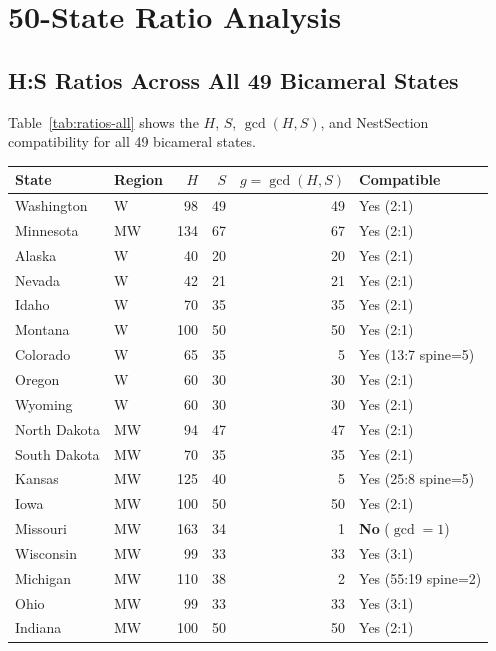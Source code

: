 \section{50-State Ratio Analysis}
\label{sec:analysis}

\subsection{H:S Ratios Across All 49 Bicameral States}
\label{sec:analysis:ratios}

Table~\ref{tab:ratios-all} shows the $H$, $S$, $\gcd(H,S)$, and
NestSection compatibility for all 49 bicameral states.

\begin{table}[h]
\centering\small
\begin{tabular}{llrrrl}
\toprule
State & Region & $H$ & $S$ & $g=\gcd(H,S)$ & Compatible \\
\midrule
Washington    & W    & 98  & 49  & 49  & Yes (2:1) \\
Minnesota     & MW   & 134 & 67  & 67  & Yes (2:1) \\
Alaska        & W    & 40  & 20  & 20  & Yes (2:1) \\
Nevada        & W    & 42  & 21  & 21  & Yes (2:1) \\
Idaho         & W    & 70  & 35  & 35  & Yes (2:1) \\
Montana       & W    & 100 & 50  & 50  & Yes (2:1) \\
Colorado      & W    & 65  & 35  & 5   & Yes (13:7 spine=5) \\
Oregon        & W    & 60  & 30  & 30  & Yes (2:1) \\
Wyoming       & W    & 60  & 30  & 30  & Yes (2:1) \\
North Dakota  & MW   & 94  & 47  & 47  & Yes (2:1) \\
South Dakota  & MW   & 70  & 35  & 35  & Yes (2:1) \\
Kansas        & MW   & 125 & 40  & 5   & Yes (25:8 spine=5) \\
Iowa          & MW   & 100 & 50  & 50  & Yes (2:1) \\
Missouri      & MW   & 163 & 34  & 1   & \textbf{No} ($\gcd=1$) \\
Wisconsin     & MW   & 99  & 33  & 33  & Yes (3:1) \\
Michigan      & MW   & 110 & 38  & 2   & Yes (55:19 spine=2) \\
Ohio          & MW   & 99  & 33  & 33  & Yes (3:1) \\
Indiana       & MW   & 100 & 50  & 50  & Yes (2:1) \\

\end{tabular}
\end{table}
